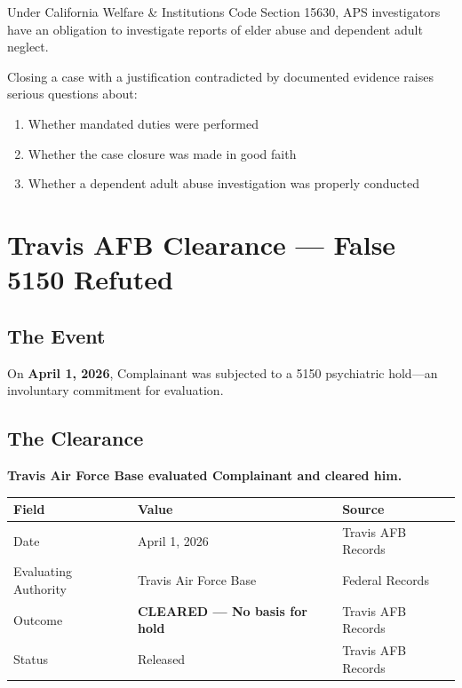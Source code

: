 \documentclass[12pt,letterpaper]{article}
\begin{document}
Under California Welfare \& Institutions Code Section 15630, APS investigators have an obligation to investigate reports of elder abuse and dependent adult neglect.

Closing a case with a justification contradicted by documented evidence raises serious questions about:
\begin{enumerate}[noitemsep]
    \item Whether mandated duties were performed
    \item Whether the case closure was made in good faith
    \item Whether a dependent adult abuse investigation was properly conducted
\end{enumerate}

\newpage

\section{Travis AFB Clearance --- False 5150 Refuted}

\subsection{The Event}

On \textbf{April 1, 2026}, Complainant was subjected to a 5150 psychiatric hold---an involuntary commitment for evaluation.

\subsection{The Clearance}

\textbf{Travis Air Force Base evaluated Complainant and cleared him.}

\begin{center}
\begin{tabular}{lll}
\toprule
\textbf{Field} & \textbf{Value} & \textbf{Source} \\
\midrule
Date & April 1, 2026 & Travis AFB Records \\
Evaluating Authority & Travis Air Force Base & Federal Records \\
Outcome & \textbf{CLEARED --- No basis for hold} & Travis AFB Records \\
Status & Released & Travis AFB Records \\
\bottomrule
\end{tabular}
\end{center}
\end{document}
